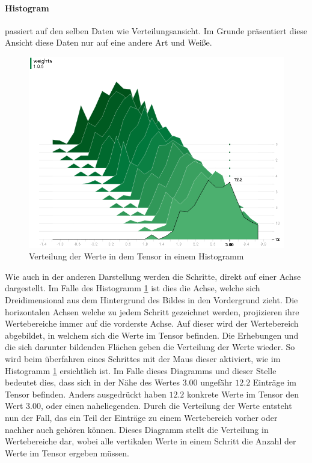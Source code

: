 \paragraph{Histogram} passiert auf den selben Daten wie Verteilungsansicht. 
Im Grunde präsentiert diese Ansicht diese Daten nur auf eine andere Art und Weiße. 
\begin{figure}
	\centering
	\includegraphics[scale=0.7]{images/histogram-value.png}
	\caption{Verteilung der Werte in dem Tensor in einem Histogramm}
	\label{fig:Histogram}
\end{figure}
Wie auch in der anderen Darstellung werden die Schritte, direkt auf einer Achse dargestellt. 
Im Falle des Histogramm \ref{fig:Histogram} ist dies die Achse, welche sich Dreidimensional aus dem Hintergrund des Bildes in den Vordergrund zieht. 
Die horizontalen Achsen welche zu jedem Schritt gezeichnet werden, projizieren ihre Wertebereiche immer auf die vorderste Achse. 
Auf dieser wird der Wertebereich abgebildet, in welchem sich die Werte im Tensor befinden. 
Die Erhebungen und die sich darunter bildenden Flächen geben die Verteilung der Werte wieder. 
So wird beim überfahren eines Schrittes mit der Maus dieser aktiviert, wie im Histogramm \ref{fig:Histogram} ersichtlich ist. 
Im Falle dieses Diagramms und dieser Stelle bedeutet dies, dass sich in der Nähe des Wertes $3.00$ ungefähr $12.2$ Einträge im Tensor befinden. 
Anders ausgedrückt haben $12.2$ konkrete Werte im Tensor den Wert $3.00$, oder einen naheliegenden. 
Durch die Verteilung der Werte entsteht nun der Fall, das ein Teil der Einträge zu einem Wertebereich vorher oder nachher auch gehören können. 
Dieses Diagramm stellt die Verteilung in Wertebereiche dar, wobei alle vertikalen Werte in einem Schritt die Anzahl der Werte im Tensor ergeben müssen. 
